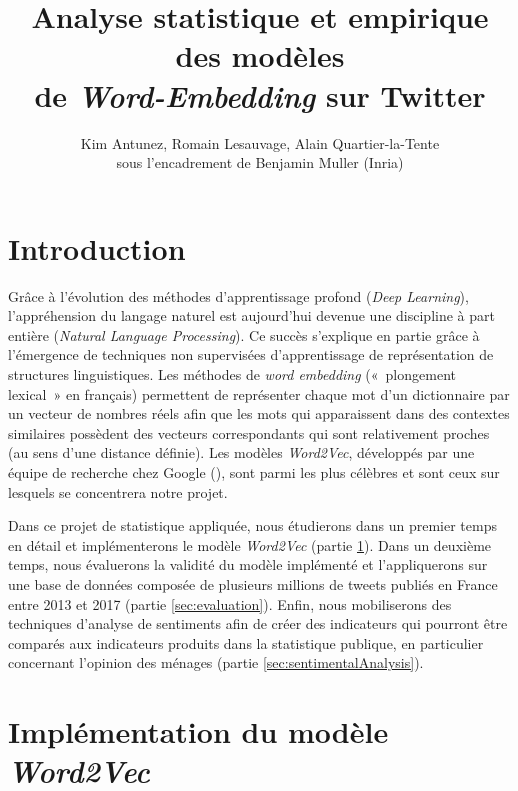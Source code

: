 \documentclass[11pt,french,french]{article}
\title{Analyse statistique et empirique des modèles\\
de \emph{Word-Embedding} sur Twitter}
\author{Kim Antunez, Romain Lesauvage, Alain Quartier-la-Tente\\
sous l'encadrement de Benjamin Muller (Inria)}
\date{}
\begin{document}
\maketitle


{
\hypersetup{linkcolor=black}
\setcounter{tocdepth}{2}
\tableofcontents
}
\newpage

\hypertarget{introduction}{%
\section*{Introduction}\label{introduction}}

Grâce à l'évolution des méthodes d'apprentissage profond (\emph{Deep Learning}), l'appréhension du langage naturel est aujourd'hui devenue une discipline à part entière (\emph{Natural Language Processing}).
Ce succès s'explique en partie grâce à l'émergence de techniques non supervisées d'apprentissage de représentation de structures linguistiques.
Les méthodes de \emph{word embedding} («~plongement lexical~» en français) permettent de représenter chaque mot d'un dictionnaire par un vecteur de nombres réels afin que les mots qui apparaissent dans des contextes similaires possèdent des vecteurs correspondants qui sont relativement proches (au sens d'une distance définie).
Les modèles \emph{Word2Vec}, développés par une équipe de recherche chez Google (\cite{Mikolov}), sont parmi les plus célèbres et sont ceux sur lesquels se concentrera notre projet.

Dans ce projet de statistique appliquée, nous étudierons dans un premier temps en détail et implémenterons le modèle \emph{Word2Vec} (partie \ref{sec:word2vec}).
Dans un deuxième temps, nous évaluerons la validité du modèle implémenté et l'appliquerons sur une base de données composée de plusieurs millions de tweets publiés en France entre 2013 et 2017 (partie \ref{sec:evaluation}).
Enfin, nous mobiliserons des techniques d'analyse de sentiments afin de créer des indicateurs qui pourront être comparés aux indicateurs produits dans la statistique publique, en particulier concernant l'opinion des ménages (partie \ref{sec:sentimentalAnalysis}).

\hypertarget{sec:word2vec}{%
\section{\texorpdfstring{Implémentation du modèle \emph{Word2Vec}}{Implémentation du modèle Word2Vec}}\label{sec:word2vec}}
\end{document}
